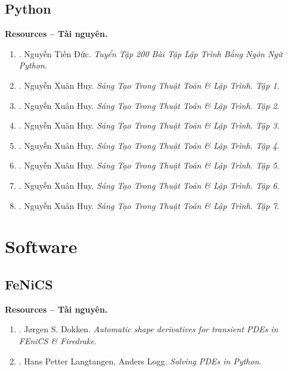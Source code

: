 \documentclass{article}
\begin{document}
\subsection{Python}
\textbf{\textsf{Resources -- Tài nguyên.}}
\begin{enumerate}
	\item \cite{Duc_200_BT_Python}. {\sc Nguyễn Tiến Đức}. {\it Tuyển Tập 200 Bài Tập Lập Trình Bằng Ngôn Ngữ Python}.
	\item \cite{Huy_sang_tao_thuat_toan_lap_trinh_tap_1}. {\sc Nguyễn Xuân Huy}. {\it Sáng Tạo Trong Thuật Toán \& Lập Trình. Tập 1}.
	\item \cite{Huy_sang_tao_thuat_toan_lap_trinh_tap_2}. {\sc Nguyễn Xuân Huy}. {\it Sáng Tạo Trong Thuật Toán \& Lập Trình. Tập 2}.
	\item \cite{Huy_sang_tao_thuat_toan_lap_trinh_tap_3}. {\sc Nguyễn Xuân Huy}. {\it Sáng Tạo Trong Thuật Toán \& Lập Trình. Tập 3}.
	\item \cite{Huy_sang_tao_thuat_toan_lap_trinh_tap_4}. {\sc Nguyễn Xuân Huy}. {\it Sáng Tạo Trong Thuật Toán \& Lập Trình. Tập 4}.
	\item \cite{Huy_sang_tao_thuat_toan_lap_trinh_tap_5}. {\sc Nguyễn Xuân Huy}. {\it Sáng Tạo Trong Thuật Toán \& Lập Trình. Tập 5}.
	\item \cite{Huy_sang_tao_thuat_toan_lap_trinh_tap_6}. {\sc Nguyễn Xuân Huy}. {\it Sáng Tạo Trong Thuật Toán \& Lập Trình. Tập 6}.
	\item \cite{Huy_sang_tao_thuat_toan_lap_trinh_tap_7}. {\sc Nguyễn Xuân Huy}. {\it Sáng Tạo Trong Thuật Toán \& Lập Trình. Tập 7}.
\end{enumerate}


\section{Software}

\subsection{FeNiCS}
\textbf{\textsf{Resources -- Tài nguyên.}}
\begin{enumerate}
	\item \cite{Dokken_Mitusch_Funke2020}. {\sc J\o rgen S. Dokken}. {\it Automatic shape derivatives for transient PDEs in FEniCS \& Firedrake}.
	\item \cite{Langtangen_Logg2016}. {\sc Hans Petter Langtangen, Anders Logg}. {\it Solving PDEs in Python}.
\end{enumerate}
\end{document}
